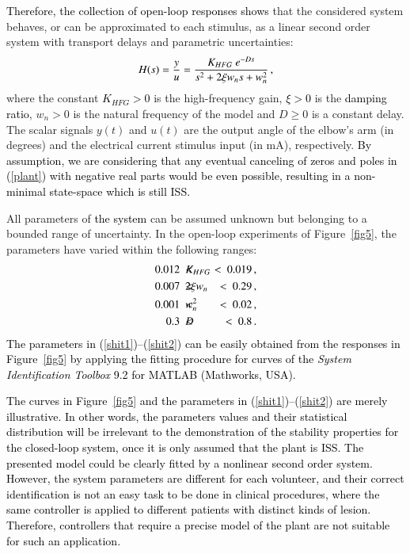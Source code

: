 \documentclass[review]{elsarticle}
\begin{document}
\textcolor{black}{Therefore, the collection of open-loop responses shows} that the considered system behaves, or can be approximated to each stimulus, as a linear second order system with transport delays \cite{N:2009} and parametric uncertainties:
%
\begin{eqnarray}\label{plant}
H(s)=\frac{y}{u}=\frac{\textcolor{black}{K_{HFG}} ~e^{-D s}}{s^2+2\xi w_n s+w_n^2}\,,
\end{eqnarray}
%
where the constant \textcolor{black}{$K_{HFG}>0$} is the high-frequency gain, \textcolor{black}{$\xi>0$} is the
\textcolor{black}{damping ratio}, $w_n>0$ is the natural frequency of the model and $D \geq 0$ is a constant delay. The scalar signals $y(t)$ and $u(t)$ are the output angle of the elbow's arm (in degrees) and the electrical current stimulus input
(in mA), respectively. \textcolor{black}{By assumption, we are considering that any eventual canceling of zeros and poles in (\ref{plant}) with negative real parts would be even possible, resulting in a non-minimal state-space which is still ISS.}




All parameters of \textcolor{black}{the system} can be assumed unknown but belonging to a bounded range of uncertainty.
In the open-loop experiments of Figure~\ref{fig5}, the parameters have varied within the following ranges:
%
\begin{eqnarray}
0.012 \ <  \!\!\!\! &\textcolor{black}{K_{HFG}}& \!\!\!\! < \  0.019 \,, \label{shit1}\\
0.007 \ < \!\!\!\! &2\xi w_n& \!\!\!\! < \ 0.29\,, \\
0.001 \ < \!\!\!\! &w_n^{2}& \!\!\!\! < \ 0.02\,, \\
0.3 \ < \!\!\!\! &D& \!\!\!\! < \ 0.8\,. \label{shit2}
\end{eqnarray}
%
\textcolor{black}{The parameters in (\ref{shit1})--(\ref{shit2}) can be easily obtained from the responses in Figure~\ref{fig5} by applying 
the fitting procedure for curves of the \textcolor{black}{\textit{System Identification Toolbox} 9.2 for MATLAB (Mathworks, USA).}}

\textcolor{black}{The curves in Figure~\ref{fig5} and the parameters in (\ref{shit1})--(\ref{shit2}) are merely illustrative. In other words, the parameters values and their statistical distribution will be irrelevant to the demonstration of the stability properties for the closed-loop system, once it is only assumed that the plant is ISS. The presented model could be clearly fitted by a nonlinear second order system. \textcolor{black}{However,} the system parameters are different for each volunteer, and their correct identification is not an easy task to be done in clinical procedures, where the same controller is applied to different patients with distinct kinds of lesion. Therefore, controllers that require a precise model of the plant are not suitable for such an application.}
\end{document}
